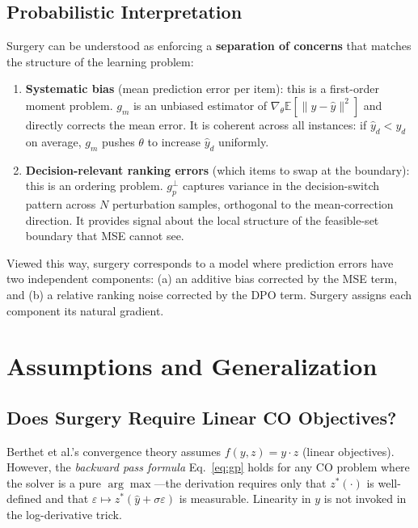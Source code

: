 \documentclass[11pt]{article}
\begin{document}
\subsection{Probabilistic Interpretation}

Surgery can be understood as enforcing a \textbf{separation of concerns} that
matches the structure of the learning problem:

\begin{enumerate}[itemsep=4pt]
  \item \textbf{Systematic bias} (mean prediction error per item): this is a
        first-order moment problem.  $g_m$ is an unbiased estimator of
        $\nabla_\theta \mathbb{E}[\|y - \hat{y}\|^2]$ and directly corrects the
        mean error.  It is coherent across all instances: if $\hat{y}_d < y_d$ on
        average, $g_m$ pushes $\theta$ to increase $\hat{y}_d$ uniformly.

  \item \textbf{Decision-relevant ranking errors} (which items to swap at the
        boundary): this is an ordering problem.  $g_p^{\perp}$ captures variance
        in the decision-switch pattern across $N$ perturbation samples, orthogonal
        to the mean-correction direction.  It provides signal about the local
        structure of the feasible-set boundary that MSE cannot see.
\end{enumerate}

Viewed this way, surgery corresponds to a model where prediction errors have
two independent components: (a) an additive bias corrected by the MSE term,
and (b) a relative ranking noise corrected by the DPO term.  Surgery assigns
each component its natural gradient.

\section{Assumptions and Generalization}

\subsection{Does Surgery Require Linear CO Objectives?}

Berthet et al.'s convergence theory assumes $f(y, z) = y \cdot z$ (linear
objectives).  However, the \emph{backward pass formula} Eq.~\eqref{eq:gp} holds
for any CO problem where the solver is a pure $\arg\max$---the derivation requires
only that $z^*(\cdot)$ is well-defined and that $\varepsilon \mapsto z^*(\hat{y}
+ \sigma\varepsilon)$ is measurable.  Linearity in $y$ is not invoked in the
log-derivative trick.
\end{document}
